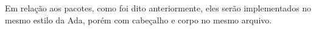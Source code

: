 Em relação aos pacotes, como foi dito anteriormente, eles serão implementados no mesmo estilo da Ada, porém com cabeçalho e corpo no mesmo arquivo. 